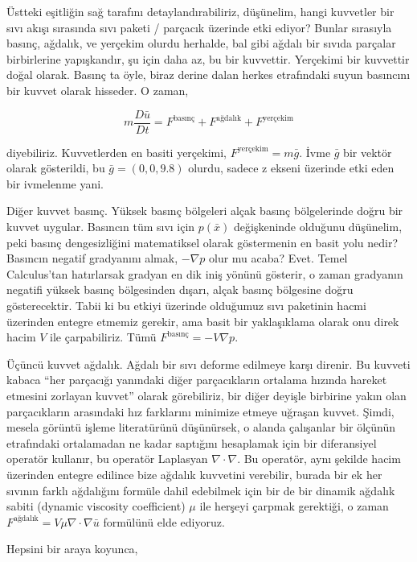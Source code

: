 \documentclass[12pt,fleqn]{article}\usepackage{../../common}
\begin{document}
Üstteki eşitliğin sağ tarafını detaylandırabiliriz, düşünelim, hangi kuvvetler
bir sıvı akışı sırasında sıvı paketi / parçacık üzerinde etki ediyor? Bunlar
sırasıyla basınç, ağdalık, ve yerçekim olurdu herhalde, bal gibi ağdalı bir
sıvıda parçalar birbirlerine yapışkandır, şu için daha az, bu bir
kuvvettir. Yerçekimi bir kuvvettir doğal olarak. Basınç ta öyle, biraz derine
dalan herkes etrafındaki suyun basıncını bir kuvvet olarak hisseder. O zaman,

$$
m \frac{D \bar{u}}{D t} = F^{\textrm{basınç}} + F^{\textrm{ağdalık}} + F^{\textrm{yerçekim}} 
$$

diyebiliriz. Kuvvetlerden en basiti yerçekimi, $F^{\textrm{yerçekim}} = m
\bar{g}$. İvme $\bar{g}$ bir vektör olarak gösterildi, bu $\bar{g} = (0, 0,
9.8)$ olurdu, sadece z ekseni üzerinde etki eden bir ivmelenme yani.

Diğer kuvvet basınç. Yüksek basınç bölgeleri alçak basınç bölgelerinde doğru bir
kuvvet uygular. Basıncın tüm sıvı için $p(\bar{x})$ değişkeninde olduğunu
düşünelim, peki basınç dengesizliğini matematiksel olarak göstermenin en basit
yolu nedir? Basıncın negatif gradyanını almak, $-\nabla p$ olur mu acaba?
Evet. Temel Calculus'tan hatırlarsak gradyan en dik iniş yönünü gösterir, o
zaman gradyanın negatifi yüksek basınç bölgesinden dışarı, alçak basınç
bölgesine doğru gösterecektir. Tabii ki bu etkiyi üzerinde olduğumuz sıvı
paketinin hacmi üzerinden entegre etmemiz gerekir, ama basit bir yaklaşıklama
olarak onu direk hacim $V$ ile çarpabiliriz. Tümü $F^{\textrm{basınç}} = - V
\nabla p$.

Üçüncü kuvvet ağdalık. Ağdalı bir sıvı deforme edilmeye karşı direnir. Bu
kuvveti kabaca ``her parçacığı yanındaki diğer parçacıkların ortalama hızında
hareket etmesini zorlayan kuvvet'' olarak görebiliriz, bir diğer deyişle
birbirine yakın olan parçacıkların arasındaki hız farklarını minimize etmeye
uğraşan kuvvet. Şimdi, mesela görüntü işleme literatürünü düşünürsek, o alanda
çalışanlar bir ölçünün etrafındaki ortalamadan ne kadar saptığını hesaplamak
için bir diferansiyel operatör kullanır, bu operatör Laplasyan $\nabla \cdot
\nabla$.  Bu operatör, aynı şekilde hacim üzerinden entegre edilince bize
ağdalık kuvvetini verebilir, burada bir ek her sıvının farklı ağdalığını formüle
dahil edebilmek için bir de bir dinamik ağdalık sabiti (dynamic viscosity
coefficient) $\mu$ ile herşeyi çarpmak gerektiği, o zaman $F^{\textrm{ağdalık}}
= V \mu \nabla \cdot \nabla \bar{u}$ formülünü elde ediyoruz.

Hepsini bir araya koyunca,
\end{document}
